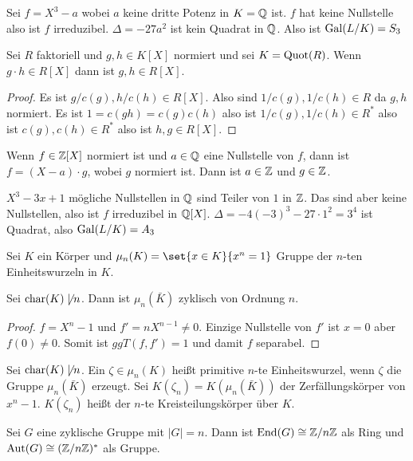 \begin{Bsp}
    Sei \(f=X^3-a\) wobei \(a\)  keine dritte Potenz in \(K=\mathbb{Q}\) ist.
    \(f\) hat keine Nullstelle also ist \(f\) irreduzibel. \(\Delta=-27a^2\) ist kein Quadrat in \(\mathbb{Q}\). Also ist \(\operatorname{Gal}(L/K)=S_3\)
\end{Bsp}
\begin{Lemma}\label{Lem:RatNst}
    Sei \(R\) faktoriell und \(g,h\in K[X]\) normiert und sei \(K=\operatorname{Quot}(R)\). Wenn \(g\cdot h\in R[X]\) dann ist \(g,h\in R[X]\).
\end{Lemma}
\begin{proof}
    Es ist \(g/c(g), h/c(h)\in R[X]\). Also sind \(1/c(g),1/c(h)\in R\) da \(g,h\) normiert.
    Es ist \(1=c(gh)=c(g)c(h)\) also ist \(1/c(g),1/c(h)\in R^*\) also ist \(c(g),c(h)\in R^*\) also ist \(h,g\in R[X]\).
\end{proof}
\begin{Kor}
    Wenn \(f\in\mathbb{Z}[X]\) normiert ist und \(a\in\mathbb{Q}\) eine Nullstelle von \(f\), dann ist \(f=(X-a)\cdot g\), wobei \(g\) normiert ist. Dann ist \(a\in\mathbb{Z}\) und \(g\in\mathbb{Z}\).
\end{Kor}
\begin{Bsp}
    \(X^3-3x+1\) mögliche Nullstellen in \(\mathbb{Q}\) sind Teiler von \(1\) in \(\mathbb{Z}\). Das sind aber keine Nullstellen, also ist \(f\) irreduzibel in \(\mathbb{Q}[X]\).
    \(\Delta=-4(-3)^3-27\cdot 1^2=3^4\) ist Quadrat, also \(\operatorname{Gal}(L/K)=A_3\)
\end{Bsp}
\begin{Def}
    Sei \(K\) ein Körper und \(\mu_n(K)=\set{x\in K}{ x^n=1}\) Gruppe der \(n\)-ten Einheitswurzeln in \(K\).
\end{Def}
\begin{Satz}
    Sei \(\operatorname{char} (K) \not\mid n\). Dann ist \(\mu_n(\bar K)\) zyklisch von Ordnung \(n\).
\end{Satz}
\begin{proof}
    \(f=X^n-1\) und \(f'=nX^{n-1}\neq 0\). Einzige Nullstelle von \(f'\) ist \(x=0\) aber \(f(0)\neq 0\). Somit ist \(ggT(f,f')=1\) und damit \(f\) separabel.
\end{proof}
\begin{Def}
    Sei \(\operatorname{char} (K)\not\mid n\). Ein \(\zeta\in\mu_n(K)\) heißt primitive \(n\)-te Einheitswurzel, wenn \(\zeta\) die Gruppe \(\mu_n(\bar K)\) erzeugt. Sei \(K(\zeta_n)=K(\mu_n(\bar K))\) der Zerfällungskörper von \(x^n-1\). \(K(\zeta_n)\) heißt der \(n\)-te Kreisteilungskörper über \(K\).
\end{Def}
\begin{Lemma}\label{Lem:MorGSn}
    Sei \(G\) eine zyklische Gruppe mit \(|G|=n\). Dann ist \(\operatorname{End}(G)\cong \mathbb{Z}/n\mathbb{Z}\) als Ring und \(\operatorname{Aut}(G)\cong (\mathbb{Z}/n\mathbb{Z})^*\) als Gruppe.
\end{Lemma}

